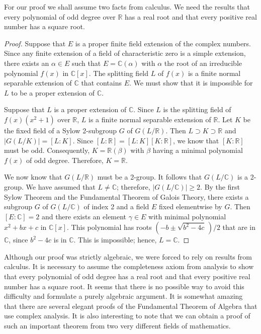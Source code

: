  
For our proof we shall assume two facts from calculus.  We need the
results that every polynomial of odd degree over ${\mathbb R}$ has a real
root and that every positive real number has a square root.  
 
 
\medskip
 
 
\begin{proof}
Suppose that $E$ is a proper finite field extension of the complex 
numbers. Since any finite extension of a field of characteristic zero
is a simple extension, there exists an $\alpha \in E$ such that $E =
{\mathbb C}( \alpha )$ with $\alpha$ the root of an irreducible
polynomial $f(x)$ in ${\mathbb C}[x]$. The splitting field $L$ of $f(x)$ 
is a finite normal separable extension of ${\mathbb C}$ that contains  $E$.
We must show that it is impossible for $L$ to be a proper extension of
${\mathbb C}$. 
 
 
Suppose that $L$ is a proper extension of ${\mathbb C}$. Since $L$ is the
splitting field of $f(x)(x^2 + 1)$ over ${\mathbb R}$, $L$ is a finite
normal separable extension of ${\mathbb R}$. Let $K$ be the fixed field
of a Sylow 2-subgroup $G$ of $G(L/{\mathbb R})$. Then $L \supset  K
\supset {\mathbb R}$ and $|G( L / K )| =[L:K]$. Since $[L : {\mathbb R}] =
[L:K][K:{\mathbb R}]$, we know that $[K:{\mathbb R}]$ must be odd.
Consequently, $K = {\mathbb R}(\beta)$ with $\beta$ having a minimal
polynomial $f(x)$ of odd degree.  Therefore, $K = {\mathbb R}$. 
 
 
We now know that $G(L/{\mathbb R})$ must be a 2-group. It follows that
$G(L / {\mathbb C})$ is a 2-group.  We have assumed that $L \neq {\mathbb
C}$; therefore, $|G(L / {\mathbb C})| \geq 2$.  By the first Sylow
Theorem and the Fundamental Theorem of Galois Theory, there exists a
subgroup $G$ of $G(L/{\mathbb C})$ of index 2 and a field $E$ fixed
elementwise by $G$. Then $[E:{\mathbb C}] = 2$ and there exists an
element $\gamma \in E$ with minimal polynomial $x^2 + b x + c$ in
${\mathbb C}[x]$.  This polynomial has roots $( - b \pm \sqrt{b^2 - 4
c}\, ) / 2$ that are in ${\mathbb C}$, since $b^2 - 4 c$ is in ${\mathbb
C}$.  This is impossible; hence, $L = {\mathbb C}$.
\end{proof}
 
 
\medskip
 
 
Although our proof was strictly algebraic, we were forced to rely on
results from calculus.  It is necessary to assume the completeness
axiom from analysis to show that every polynomial of odd degree has a
real root and that every positive real number has a square root.  It
seems that there is no possible way to avoid this difficulty and
formulate a purely algebraic argument.  It is somewhat amazing that
there are several elegant proofs of the Fundamental Theorem of Algebra
that use complex analysis.  It is also interesting to note that we can
obtain a proof of such an important theorem from two very different
fields of mathematics. 
 
